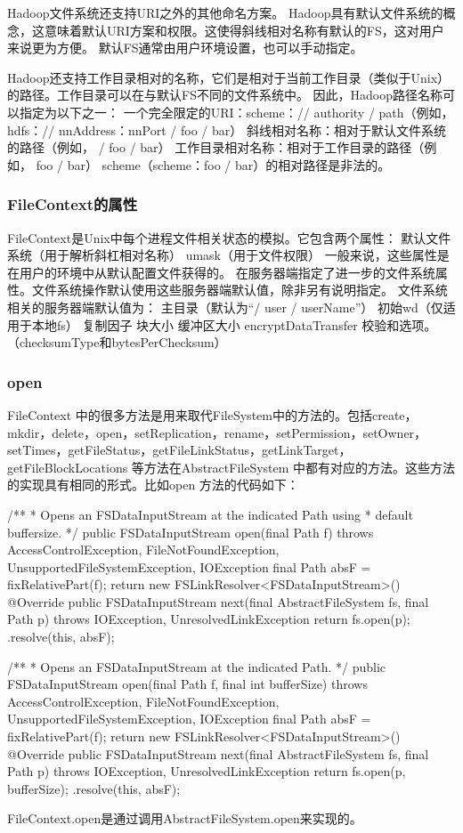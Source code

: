 Hadoop文件系统还支持URI之外的其他命名方案。
Hadoop具有默认文件系统的概念，这意味着默认URI方案和权限。这使得斜线相对名称有默认的FS，这对用户来说更为方便。
默认FS通常由用户环境设置，也可以手动指定。

Hadoop还支持工作目录相对的名称，它们是相对于当前工作目录（类似于Unix）的路径。工作目录可以在与默认FS不同的文件系统中。
因此，Hadoop路径名称可以指定为以下之一：
一个完全限定的URI：scheme：// authority / path（例如， hdfs：// nnAddress：nnPort / foo / bar）
斜线相对名称：相对于默认文件系统的路径（例如， / foo / bar）
工作目录相对名称：相对于工作目录的路径（例如， foo / bar）
scheme（scheme：foo / bar）的相对路径是非法的。

\subsubsection{FileContext的属性}
FileContext是Unix中每个进程文件相关状态的模拟。它包含两个属性：
默认文件系统（用于解析斜杠相对名称）
umask（用于文件权限）
一般来说，这些属性是在用户的环境中从默认配置文件获得的。
在服务器端指定了进一步的文件系统属性。文件系统操作默认使用这些服务器端默认值，除非另有说明指定。
文件系统相关的服务器端默认值为：
主目录（默认为“/ user / userName”）
初始wd（仅适用于本地fs）
复制因子
块大小
缓冲区大小
encryptDataTransfer
校验和选项。 （checksumType和bytesPerChecksum）

\subsubsection{open}
FileContext 中的很多方法是用来取代FileSystem中的方法的。包括create，mkdir，delete，open，setReplication，rename，setPermission，setOwner，setTimes，getFileStatus，getFileLinkStatus，getLinkTarget，getFileBlockLocations 等方法在AbstractFileSystem 中都有对应的方法。这些方法的实现具有相同的形式。比如open 方法的代码如下：
\begin{java}
/**
   * Opens an FSDataInputStream at the indicated Path using
   * default buffersize.
   */
 public FSDataInputStream open(final Path f) throws AccessControlException,
      FileNotFoundException, UnsupportedFileSystemException, IOException {
    final Path absF = fixRelativePart(f);
    return new FSLinkResolver<FSDataInputStream>() {
      @Override
      public FSDataInputStream next(final AbstractFileSystem fs, final Path p)
        throws IOException, UnresolvedLinkException {
        return fs.open(p);
      }
    }.resolve(this, absF);
  }

  /**
   * Opens an FSDataInputStream at the indicated Path.
   */
  public FSDataInputStream open(final Path f, final int bufferSize)
      throws AccessControlException, FileNotFoundException,
      UnsupportedFileSystemException, IOException {
    final Path absF = fixRelativePart(f);
    return new FSLinkResolver<FSDataInputStream>() {
      @Override
      public FSDataInputStream next(final AbstractFileSystem fs, final Path p)
        throws IOException, UnresolvedLinkException {
        return fs.open(p, bufferSize);
      }
    }.resolve(this, absF);
  }
\end{java}
FileContext.open是通过调用AbstractFileSystem.open来实现的。

